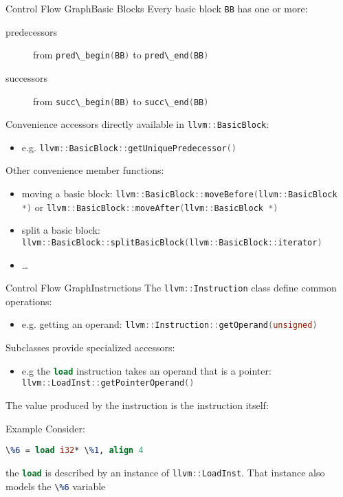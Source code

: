 \documentclass[10pt,mathserif]{beamer}
\newcommand{\cppinline}[1]{\lstinline[language=C++]!#1!}
\newcommand{\llvminline}[1]{\lstinline[language=LLVM]!#1!}
\begin{document}
\begin{frame}{Control Flow Graph}{Basic Blocks}
Every basic block \cppinline{BB} has one or more:

\begin{description}
\item[predecessors] from \cppinline{pred\_begin(BB)} to
      \cppinline{pred\_end(BB)}
\item[successors] from \cppinline{succ\_begin(BB)} to
      \cppinline{succ\_end(BB)}
\end{description}

Convenience accessors directly available in \cppinline{llvm::BasicBlock}:

\begin{itemize}
\item e.g. \cppinline{llvm::BasicBlock::getUniquePredecessor()}
\end{itemize}

Other convenience member functions:

\begin{itemize}
\item moving a basic block:
      \cppinline{llvm::BasicBlock::moveBefore(llvm::BasicBlock *)} or
      \cppinline{llvm::BasicBlock::moveAfter(llvm::BasicBlock *)}
\item split a basic block:
      \cppinline{llvm::BasicBlock::splitBasicBlock(llvm::BasicBlock::iterator)}
\item \ldots
\end{itemize}
\end{frame}

\begin{frame}{Control Flow Graph}{Instructions}
The \cppinline{llvm::Instruction} class define common operations:

\begin{itemize}
\item e.g. getting an operand: \cppinline{llvm::Instruction::getOperand(unsigned)}
\end{itemize}

Subclasses provide specialized accessors:

\begin{itemize}
\item e.g the \llvminline{load} instruction takes an operand that is a pointer:
      \cppinline{llvm::LoadInst::getPointerOperand()}
\end{itemize}

The value produced by the instruction is the \alert{instruction itself}:

\begin{block}{Example}
Consider:

\centering
\llvminline{\%6 = load i32* \%1, align 4}

\flushleft
the \llvminline{load} is described
by an instance of \cppinline{llvm::LoadInst}. That instance also models the
\llvminline{\%6} variable
\end{block}
\end{frame}
\end{document}
